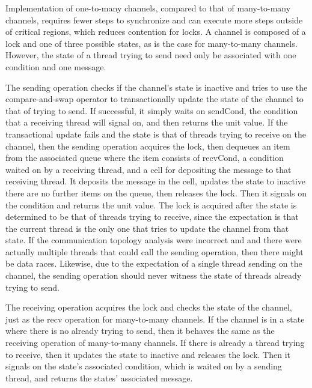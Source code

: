 \documentclass{article}
\begin{document}
Implementation of one-to-many channels, compared to that of many-to-many channels,
requires fewer
steps to synchronize and can execute more steps outside of critical regions, which reduces
contention for locks.  A channel is composed of a lock and one of three possible states, as is
the case for many-to-many channels.  However, the state of a thread trying to send need only be
associated with one condition and one message.  

The sending operation checks if the channel's state is inactive and tries to use the
compare-and-swap operator to transactionally update the state of the channel to that of trying to
send.  If successful, it simply waits on sendCond, the condition that a receiving thread will
signal on, and then returns the unit value.  If the transactional update fails and the state is
that of threads trying to receive on the channel, then the sending operation acquires the lock,
then dequeues an item from the associated queue where the item consists of recvCond, a
condition waited on by a receiving thread, and a cell for depositing the message to that
receiving thread.  It deposits the message in the cell, updates the state to inactive there are
no further items on the queue, then releases the lock.  Then it signals on the condition and
returns the unit value. The lock is acquired after the state is determined to be that of
threads trying to receive, since the expectation is that the current thread is the only one
that tries to update the channel from that state.  If the communication topology analysis were
incorrect and and there were actually multiple threads that could call the sending operation, then
there might be data races.  Likewise, due to the expectation of a single thread sending on the
channel, the sending operation should never witness the state of threads already trying to send.

The receiving operation acquires the lock and checks the state of the channel, just as the recv
operation for many-to-many channels.  If the channel is in a state where there is no already
trying to send, then it behaves the same as the receiving operation of many-to-many channels. If
there is already a thread trying to receive, then it updates the state to inactive and releases
the lock.  Then it signals on the state's associated condition, which is waited on by a sending
thread, and returns the states' associated message.
\end{document}
